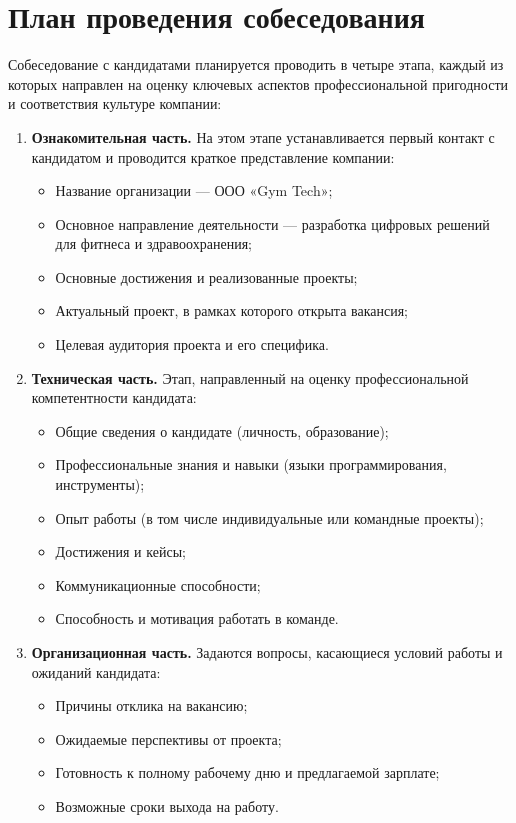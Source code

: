 \documentclass[14pt, russian]{matmex-diploma-custom}
\begin{document}
\section{План проведения собеседования}

Собеседование с кандидатами планируется проводить в четыре этапа, каждый из которых направлен на оценку ключевых аспектов профессиональной пригодности и соответствия культуре компании:

\begin{enumerate}
    \item \textbf{Ознакомительная часть.}
    На этом этапе устанавливается первый контакт с кандидатом и проводится краткое представление компании:
    \begin{itemize}
        \item Название организации — ООО «Gym Tech»;
        \item Основное направление деятельности — разработка цифровых решений для фитнеса и здравоохранения;
        \item Основные достижения и реализованные проекты;
        \item Актуальный проект, в рамках которого открыта вакансия;
        \item Целевая аудитория проекта и его специфика.
    \end{itemize}

    \item \textbf{Техническая часть.}
    Этап, направленный на оценку профессиональной компетентности кандидата:
    \begin{itemize}
        \item Общие сведения о кандидате (личность, образование);
        \item Профессиональные знания и навыки (языки программирования, инструменты);
        \item Опыт работы (в том числе индивидуальные или командные проекты);
        \item Достижения и кейсы;
        \item Коммуникационные способности;
        \item Способность и мотивация работать в команде.
    \end{itemize}

    \item \textbf{Организационная часть.}
    Задаются вопросы, касающиеся условий работы и ожиданий кандидата:
    \begin{itemize}
        \item Причины отклика на вакансию;
        \item Ожидаемые перспективы от проекта;
        \item Готовность к полному рабочему дню и предлагаемой зарплате;
        \item Возможные сроки выхода на работу.
    \end{itemize}


\end{enumerate}
\end{document}
